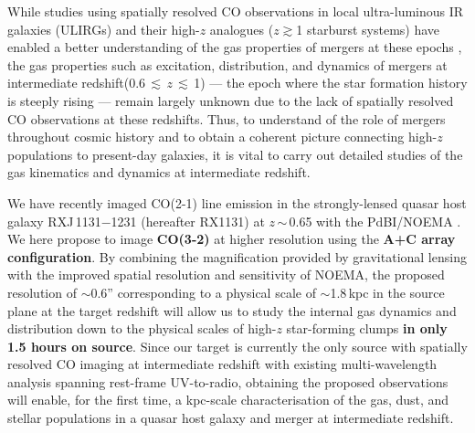 \documentclass[11pt,a4paper,twoside,graphicx,color]{article}
\newcommand{\bco}{\mbox{CO(2-1)}\xspace}
\newcommand{\cco}{\mbox{CO(3-2)}\xspace}
\newcommand{\Fig}[1]{Fig.~\ref{fig:#1}}
\newcommand{\ssim}{\,$\sim$\,}
\newcommand{\mulw}{multi-wavelength\xspace}
\newcommand{\SF}{star formation\xspace}
\newcommand{\SB}{starburst\xspace}
\newcommand{\highz}{high-$z$\xspace}
\newcommand{\atinterz}{at intermediate redshift\xspace}
\newcommand{\obs}{observations\xspace}
\begin{document}
While studies using spatially resolved CO \obs in
local ultra-luminous IR galaxies (ULIRGs) and their \highz analogues ($z$$\gtrsim$1 \SB systems)
have enabled a better understanding of the gas properties of mergers at these epochs 
\citep[e.g.][]{Carilli10a, Engel10a,Bothwell10a,Riechers11b, Ivison11a},
the gas properties such as excitation, distribution, and dynamics of mergers 
\atinterz (0.6\,$\lesssim$\,$z$\,$\lesssim$\,1) --- the epoch where the \SF history is steeply rising --- remain largely unknown
due to the lack of spatially resolved CO observations at these redshifts.
Thus, to understand of the role of mergers throughout cosmic history and
to obtain a coherent picture connecting \highz populations to present-day galaxies, 
it is vital to carry out detailed studies of the gas kinematics and dynamics \atinterz.

We have recently imaged \bco line emission
in the strongly-lensed quasar host galaxy
 RXJ\,1131$-$1231 (hereafter RX1131) at $z$\ssim0.65
with the PdBI/NOEMA \citep[\Fig{combine};][]{Leung16b}. 
We here propose to image {\bf \cco} 
at higher resolution using the {\bf A+C array configuration}.
By combining the magnification provided by gravitational lensing with the improved spatial resolution and sensitivity of NOEMA, 
the proposed resolution of $\sim$0.6''
corresponding to a physical scale of $\sim$1.8\,kpc in the source plane at the target redshift
will allow us to study the internal gas dynamics and distribution 
down to the physical scales of \highz star-forming clumps {\bf in only 1.5 hours on source}.
Since our target is currently the only source with spatially resolved CO
imaging at intermediate redshift with existing \mulw analysis spanning rest-frame
UV-to-radio, obtaining the proposed \obs will enable, for the first time, a kpc-scale characterisation of the gas, dust, and stellar populations in a quasar host galaxy and merger at intermediate redshift.
\end{document}
